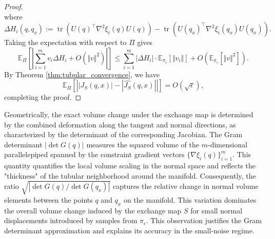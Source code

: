 \documentclass[12pt]{article}
\begin{document}
\begin{proof}
\begin{equation}
\end{equation}
where 
\begin{equation}\nonumber
    \Delta H_i(q, q_x) := \operatorname{tr}(U(q)^\top \nabla^2\xi_i(q) U(q)) - \operatorname{tr}(U(q_x)^\top \nabla^2\xi_i(q_x) U(q_x)).
\end{equation}
Taking the expectation with respect to $\Pi$ gives
\begin{equation}\nonumber
\mathbb{E}_{\Pi} [ | \sum_{i=1}^m v_i \Delta H_i + O(\Vert v\Vert^2) |] \le \sum_{i=1}^m \vert\Delta H_i\vert \cdot \mathbb{E}_{\pi_\varepsilon}[\Vert v_i\Vert] + O(\mathbb E_{\pi_\varepsilon}[\Vert v\Vert^2]).
\end{equation}
By Theorem \ref{thm:tubular_convergence}, we have 
\begin{equation}\nonumber
\mathbb{E}_{\Pi} \left[ \left| |J_S(q,x)| - |\widehat{J_S}(q,x)| \right| \right] = O(\sqrt{\epsilon}),
\end{equation}
completing the proof.
\end{proof}
 Geometrically, the exact volume change under the exchange map is determined by the combined deformation along the tangent and normal directions, as characterized by the determinant of the corresponding Jacobian.
The Gram determinant $|\det G(q)|$ measures the squared volume of the $m$-dimensional parallelepiped spanned by the constraint gradient vectors $\{\nabla\xi_i(q)\}_{i=1}^m$. This quantity quantifies the local volume scaling in the normal space and reflects the "thickness" of the tubular neighborhood around the manifold.
Consequently, the ratio
\(
\sqrt{|\det G(q)/\det G(q_x)|}
\)
captures the relative change in normal volume elements between the points $q$ and $q_x$ on the manifold. This variation dominates the overall volume change induced by the exchange map $S$ for small normal
displacements introduced by samples from $\pi_\epsilon$. This observation justifies the Gram determinant approximation and explains its accuracy in the small-noise regime.
\end{document}

